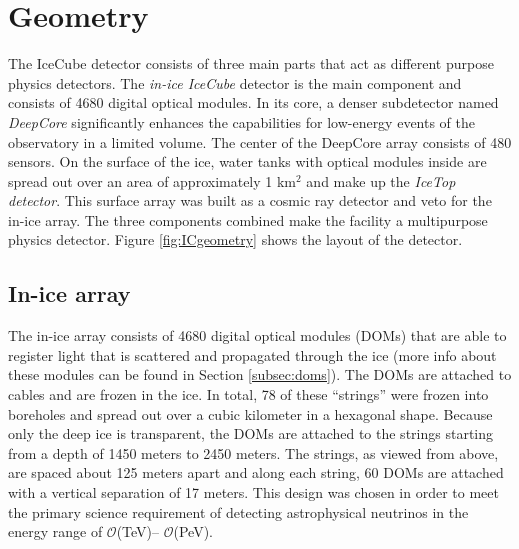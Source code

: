 \section{Geometry}
The IceCube detector consists of three main parts that act as different purpose physics detectors. 
The \textit{in-ice IceCube} detector is the main component and consists of 4680 digital optical modules. In its core, a denser subdetector named \textit{DeepCore} significantly enhances the capabilities for low-energy events of the observatory in a limited volume. The center of the DeepCore array consists of 480 sensors.
On the surface of the ice, water tanks with optical modules inside are spread out over an area of approximately 1 km$^2$ and make up the \textit{IceTop detector}. This surface array was built as a cosmic ray detector and veto for the in-ice array.  The three components combined make the facility a multipurpose physics detector. Figure \ref{fig:ICgeometry} shows the layout of the detector.

\subsection{In-ice array}
The in-ice array consists of 4680 digital optical modules (DOMs) that are able to register light that is scattered and propagated through the ice (more info about these modules can be found in Section \ref{subsec:doms}). The DOMs are attached to cables and are frozen in the ice. In total, 78 of these ``strings'' were frozen into boreholes and spread out over a cubic kilometer in a hexagonal shape. Because only the deep ice is transparent, the DOMs are attached to the strings starting from a depth of 1450 meters to 2450 meters. The strings, as viewed from above, are spaced about 125 meters apart and along each string, 60 DOMs are attached with a vertical separation of 17 meters. This design was chosen in order to meet the primary science requirement of detecting astrophysical neutrinos in the energy range of $\mathcal{O}$(TeV)– $\mathcal{O}$(PeV).

 
